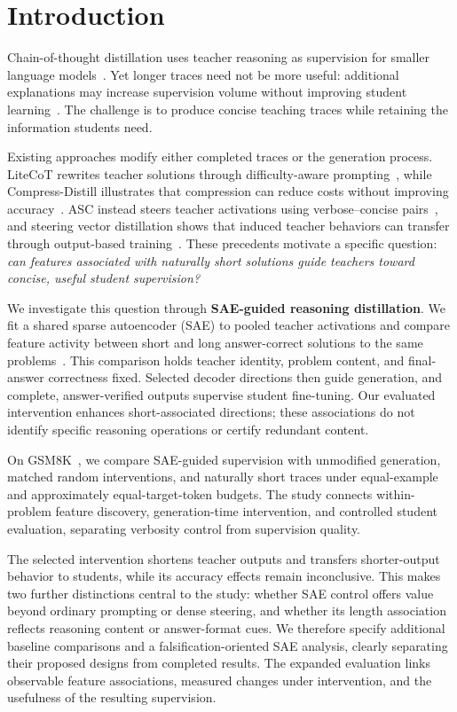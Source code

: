 \section{Introduction}
\label{sec:introduction}

Chain-of-thought distillation uses teacher reasoning as supervision for smaller language models~\citep{wei2022chain,hsieh2023distilling}.
Yet longer traces need not be more useful: additional explanations may increase supervision volume without improving student learning~\citep{li2025small}.
The challenge is to produce concise teaching traces while retaining the information students need.

Existing approaches modify either completed traces or the generation process.
LiteCoT rewrites teacher solutions through difficulty-aware prompting~\citep{wu2025concise}, while Compress-Distill illustrates that compression can reduce costs without improving accuracy~\citep{griot2026compress}.
ASC instead steers teacher activations using verbose--concise pairs~\citep{azizi2026activation}, and steering vector distillation shows that induced teacher behaviors can transfer through output-based training~\citep{blank2026subliminal}.
These precedents motivate a specific question: \emph{can features associated with naturally short solutions guide teachers toward concise, useful student supervision?}

We investigate this question through \textbf{SAE-guided reasoning distillation}.
We fit a shared sparse autoencoder (SAE) to pooled teacher activations and compare feature activity between short and long answer-correct solutions to the same problems~\citep{cunningham2023sparse,gao2024scaling}.
This comparison holds teacher identity, problem content, and final-answer correctness fixed.
Selected decoder directions then guide generation, and complete, answer-verified outputs supervise student fine-tuning.
Our evaluated intervention enhances short-associated directions; these associations do not identify specific reasoning operations or certify redundant content.

On GSM8K~\citep{cobbe2021training}, we compare SAE-guided supervision with unmodified generation, matched random interventions, and naturally short traces under equal-example and approximately equal-target-token budgets.
The study connects within-problem feature discovery, generation-time intervention, and controlled student evaluation, separating verbosity control from supervision quality.

The selected intervention shortens teacher outputs and transfers shorter-output behavior to students, while its accuracy effects remain inconclusive.
This makes two further distinctions central to the study: whether SAE control offers value beyond ordinary prompting or dense steering, and whether its length association reflects reasoning content or answer-format cues.
We therefore specify additional baseline comparisons and a falsification-oriented SAE analysis, clearly separating their proposed designs from completed results.
The expanded evaluation links observable feature associations, measured changes under intervention, and the usefulness of the resulting supervision.
